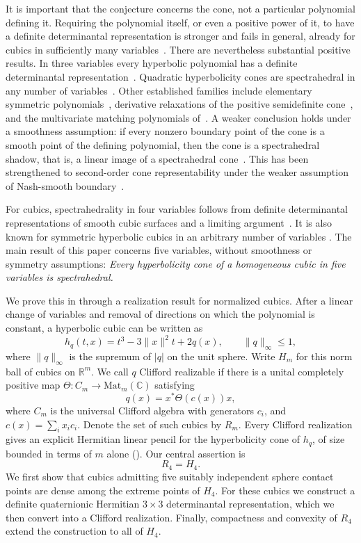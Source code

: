 \documentclass[11pt,onecolumn]{article}
\theoremstyle{blueplain}
\theoremstyle{bluedefinition}
\theoremstyle{bluedefinition}
\newcommand{\R}{\mathbb R}
\newcommand{\C}{\mathbb C}
\newcommand{\M}{\mathrm{Mat}}
\begin{document}
It is important that the conjecture concerns the cone, not a particular
polynomial defining it.  Requiring the polynomial itself, or even a
positive power of it, to have a definite determinantal representation
is stronger and fails in general, already for cubics in sufficiently
many variables~\cite{Saunderson}.  There are nevertheless substantial
positive results.  In three variables every hyperbolic polynomial has
a definite determinantal representation~\cite{HeltonVinnikov}.
Quadratic hyperbolicity cones are spectrahedral in any number of
variables~\cite{NetzerThomDeterminantal}.  Other established families include
elementary symmetric polynomials~\cite{BrandenElementary}, derivative
relaxations of the positive semidefinite cone~\cite{KummerSpectral},
and the multivariate matching polynomials of~\cite{Amini}.
A weaker conclusion holds under a smoothness assumption: if every
nonzero boundary point of the cone is a smooth point of the defining
polynomial, then the cone is a spectrahedral shadow, that is, a linear
image of a spectrahedral cone~\cite{NetzerSanyal}.
This has been strengthened to second-order cone representability under
the weaker assumption of Nash-smooth boundary~\cite{ScheidererSOC}.

For cubics, spectrahedrality in four variables follows from definite
determinantal representations of smooth cubic surfaces and a limiting
argument~\cite{BuckleyKosir,Saunderson}.  It is also known for symmetric
hyperbolic cubics in an arbitrary number of variables
\cite{BlekhermanLindbergShu}.
The main result of this paper concerns five variables, without
smoothness or symmetry assumptions:
\emph{Every hyperbolicity cone of a homogeneous cubic in five variables
is spectrahedral.}

We prove this in  through a realization result for normalized
cubics.  After a linear change of variables and removal of directions
on which the polynomial is constant, a hyperbolic cubic can be written as
\[
 h_q(t,x)=t^3-3\|x\|^2t+2q(x),\qquad \|q\|_\infty\leqslant1,
\]
where $\|q\|_\infty$ is the supremum of $|q|$ on the unit sphere.
Write $H_m$ for this norm ball of cubics on $\R^m$.
We call $q$ Clifford realizable if there is a unital completely positive
map $\Theta\colon C_m\to\M_m(\C)$ satisfying
\[
 q(x)=x^*\Theta(c(x))x,
\]
where $C_m$ is the universal Clifford algebra with generators $c_i$, and
$c(x)=\sum_i x_ic_i$.  Denote the set of such cubics by $R_m$. Every Clifford realization gives an explicit Hermitian linear
pencil for the hyperbolicity cone of $h_q$, of size bounded in terms of $m$ alone
(). 
Our central assertion is
\[
 R_4=H_4.
\]
We first show that cubics admitting five suitably independent
sphere contact points are dense among the extreme points of $H_4$.
For these cubics we construct a definite quaternionic Hermitian
$3\times3$ determinantal representation, which   we then  convert into a Clifford
realization.  Finally, compactness and convexity of $R_4$ extend the
construction to all of $H_4$.
\end{document}
